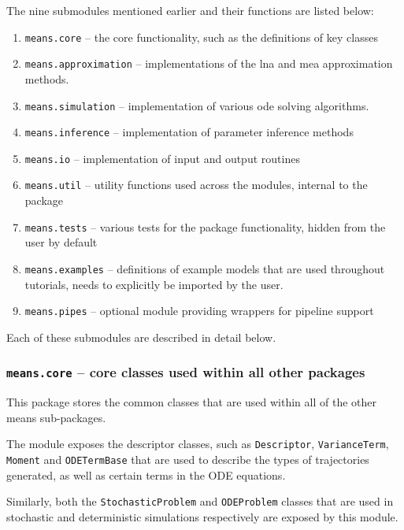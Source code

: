 The nine submodules mentioned earlier and their functions are listed below:
\begin{enumerate}
    \item \verb"means.core" -- the core functionality, such as the definitions of key classes
    \item \verb"means.approximation" -- implementations of the \gls{lna} and \gls{mea} approximation methods.
    
    \item \verb"means.simulation" -- implementation of various \gls{ode} solving algorithms.
    \item \verb"means.inference" -- implementation of parameter inference methods
    \item \verb"means.io" -- implementation of input and output routines
    \item \verb"means.util" -- utility functions used across the modules, internal to the package
    \item \verb"means.tests" -- various tests for the package functionality, hidden from the user by default
    \item \verb"means.examples" -- definitions of example models that are used throughout tutorials, needs to explicitly be imported by the user.
    \item \verb"means.pipes" -- optional module providing wrappers for pipeline support
\end{enumerate}

Each of these submodules are described in detail below.

\subsubsection{{\tt means.core} -- core classes used within all other packages}
This package stores the common classes that are used within all of the other means sub-packages.

The module exposes the descriptor classes, such as \verb"Descriptor",
\verb"VarianceTerm", \verb"Moment" and
\verb"ODETermBase" that are used to describe the types of trajectories generated,
as well as certain terms in the ODE equations.

Similarly, both the \verb"StochasticProblem" and
\verb"ODEProblem" classes that are used in stochastic and deterministic simulations respectively are exposed by this module.

